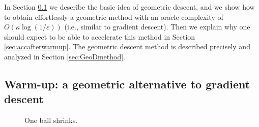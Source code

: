 \documentclass[openany]{now}
\renewcommand{\epsilon}{\varepsilon}
\begin{document}
In Section \ref{sec:warmup} we describe the basic idea of geometric descent, and we show how to obtain effortlessly a geometric method with an oracle complexity of $O(\kappa \log(1/\epsilon))$ (i.e., similar to gradient descent). Then we explain why one should expect to be able to accelerate this method in Section \ref{sec:accafterwarmup}. The geometric descent method is described precisely and analyzed in Section \ref{sec:GeoDmethod}.

\subsection{Warm-up: a geometric alternative to gradient descent} \label{sec:warmup}
\begin{figure}
\begin{center}
\end{center}
\caption{One ball shrinks.}
\label{fig:one_ball}
\end{figure}
\end{document}
